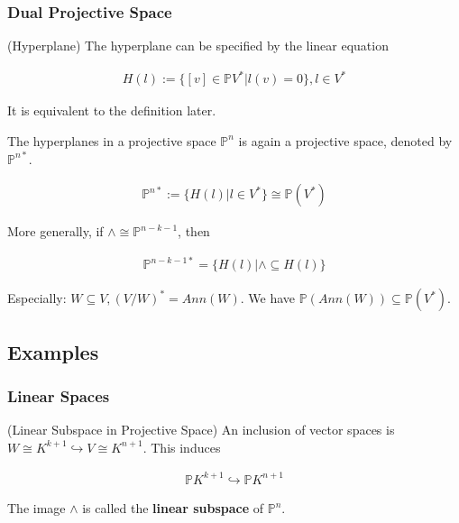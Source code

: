 \documentclass[Total.tex]{subfiles}
\begin{document}
			\subsubsection{Dual Projective Space}
			
			\begin{Def}
				(Hyperplane) The hyperplane can be specified by the linear equation
				
				\begin{gather*}
					H(l):=\{[v]\in \mathbb{P}V^*|l(v)=0\},l\in V^*
				\end{gather*}
				
				It is equivalent to the definition later.
			\end{Def}
			
			\begin{Def}
				\label{Classical-Algebraic-Geometry-Dual-Projective-Space} The hyperplanes in a projective space $\mathbb{P}^n$ is again a projective space, denoted by $\mathbb{P}^{n*}$.
				
				\begin{gather*}
					\mathbb{P}^{n*}:=\{H(l)|l\in V^*\}\cong \mathbb{P}(V^*)
				\end{gather*}
				
				More generally, if $\wedge\cong \mathbb{P}^{n-k-1}$, then
				
				\begin{gather*}
					\mathbb{P}^{n-k-1*}=\{H(l)|\wedge\subseteq H(l)\}
				\end{gather*}
			\end{Def}
			
			Especially: $W\subseteq V,(V/W)^*=Ann(W)$. We have $\mathbb{P}(Ann(W))\subseteq \mathbb{P}(V^*)$. 
			
		\subsection{Examples}
			
			\subsubsection{Linear Spaces}
			
			\begin{Def}
				(Linear Subspace in Projective Space) An inclusion of vector spaces is $W\cong K^{k+1}\hookrightarrow V\cong K^{n+1}$. This induces 
				
				\begin{gather*}
					\mathbb{P}K^{k+1}\hookrightarrow \mathbb{P}K^{n+1}
				\end{gather*}
				
				The image $\wedge$ is called the \textbf{linear subspace} of $\mathbb{P}^n$. 
			\end{Def}
			
\end{document}
